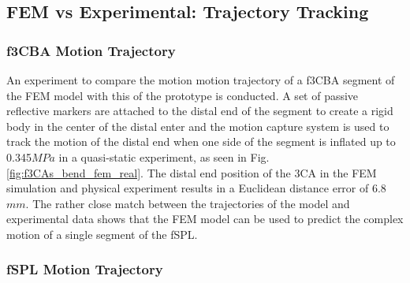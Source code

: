 \documentclass[letterpaper, 10 pt, conference]{ieeeconf}  %
\begin{document}
\subsection{FEM vs Experimental: Trajectory Tracking}

\subsubsection{f3CBA Motion Trajectory}





An experiment to compare the motion motion trajectory of a f3CBA segment of the FEM model with this of the prototype is conducted. A set of passive reflective markers are attached to the distal end of the segment to create a rigid body in the center of the distal enter and the motion capture system is used to track the motion of the distal end when one side of the segment is inflated up to 0.345$MPa$ in a quasi-static experiment, as seen in Fig. \ref{fig:f3CAs_bend_fem_real}. The distal end position of the 3CA in the FEM simulation and physical experiment results in a Euclidean distance error of 6.8$mm$. The rather close match between the trajectories of the model and experimental data shows that the FEM model can be used to predict the complex motion of a single segment of the fSPL.
% 
% 
% 
% 


\subsubsection{fSPL Motion Trajectory}
\end{document}
